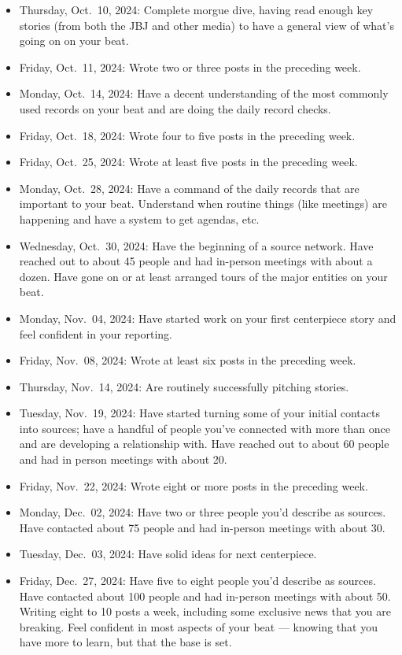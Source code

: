 \documentclass[
  11pt,
  american,
  letterpaperpaper,
  extrafontsizes,onecolumn,openright
  ]{memoir}
\begin{document}
\begin{itemize}
\item
  Thursday, Oct.~10, 2024: Complete morgue dive, having read enough key stories (from both the JBJ and other media) to have a general view of what's going on on your beat.
\item
  Friday, Oct.~11, 2024: Wrote two or three posts in the preceding week.
\item
  Monday, Oct.~14, 2024: Have a decent understanding of the most commonly used records on your beat and are doing the daily record checks.
\item
  Friday, Oct.~18, 2024: Wrote four to five posts in the preceding week.
\item
  Friday, Oct.~25, 2024: Wrote at least five posts in the preceding week.
\item
  Monday, Oct.~28, 2024: Have a command of the daily records that are important to your beat. Understand when routine things (like meetings) are happening and have a system to get agendas, etc.
\item
  Wednesday, Oct.~30, 2024: Have the beginning of a source network. Have reached out to about 45 people and had in-person meetings with about a dozen. Have gone on or at least arranged tours of the major entities on your beat.
\item
  Monday, Nov.~04, 2024: Have started work on your first centerpiece story and feel confident in your reporting.
\item
  Friday, Nov.~08, 2024: Wrote at least six posts in the preceding week.
\item
  Thursday, Nov.~14, 2024: Are routinely successfully pitching stories.
\item
  Tuesday, Nov.~19, 2024: Have started turning some of your initial contacts into sources; have a handful of people you've connected with more than once and are developing a relationship with. Have reached out to about 60 people and had in person meetings with about 20.
\item
  Friday, Nov.~22, 2024: Wrote eight or more posts in the preceding week.
\item
  Monday, Dec.~02, 2024: Have two or three people you'd describe as sources. Have contacted about 75 people and had in-person meetings with about 30.
\item
  Tuesday, Dec.~03, 2024: Have solid ideas for next centerpiece.
\item
  Friday, Dec.~27, 2024: Have five to eight people you'd describe as sources. Have contacted about 100 people and had in-person meetings with about 50. Writing eight to 10 posts a week, including some exclusive news that you are breaking. Feel confident in most aspects of your beat --- knowing that you have more to learn, but that the base is set.
\end{itemize}
\end{document}
